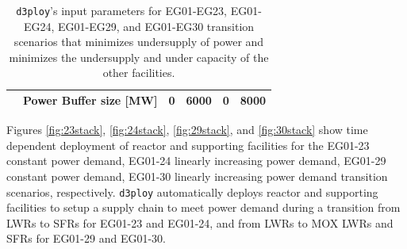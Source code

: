 \documentclass[11pt]{article}
\newcommand{\deploy}{\texttt{d3ploy}\xspace}%
\begin{document}
\begin{table}[]
{\begin{tabular}{l|l|c|l|l|l}
											  & Power Buffer size [MW]                                                   & 0 & 6000 & 0 & 8000 \\ \hline
	\end{tabular}%
	}
	\caption{\deploy's input parameters for EG01-EG23, EG01-EG24, EG01-EG29, and 
	EG01-EG30 transition scenarios
	that minimizes undersupply of power and minimizes 
	the undersupply and under capacity of the other facilities. }
	\label{tab:bestinputs}
	\end{table}

Figures \ref{fig:23stack}, \ref{fig:24stack}, \ref{fig:29stack}, 
and \ref{fig:30stack} show
time dependent deployment of reactor and supporting facilities for 
the EG01-23 constant power demand, EG01-24 linearly increasing power demand, 
EG01-29 constant power demand, EG01-30 linearly increasing power demand
transition scenarios, respectively. 
\deploy automatically deploys reactor and supporting facilities 
to setup a supply chain to meet power demand
during a transition from \glspl{LWR} to \glspl{SFR} for EG01-23 and EG01-24, 
and from \glspl{LWR} to \gls{MOX} \glspl{LWR} and \glspl{SFR} for EG01-29 and
EG01-30. 
\end{document}
